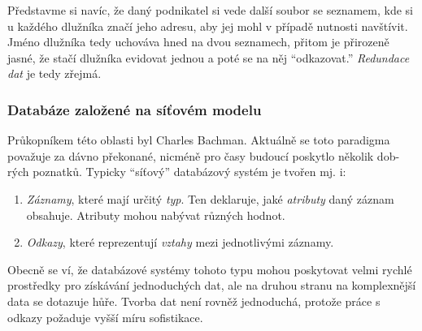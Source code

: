 Představme si navíc, že daný podnikatel si vede další soubor se seznamem, kde si u každého dlužníka značí jeho adresu, aby jej mohl v případě nutnosti navštívit. Jméno dlužníka tedy uchováva hned na dvou seznamech, přitom je přirozeně jasné, že stačí dlužníka evidovat jednou a poté se na něj \enquote{odkazovat.} \textit{Redundace dat} je tedy zřejmá.

\subsubsection{Databáze založené na síťovém modelu}
Průkopníkem této oblasti byl Charles Bachman. Aktuálně se toto paradigma považuje za dávno překonané, nicméně pro časy budoucí poskytlo několik dob-rých poznatků. Typicky \enquote{síťový} databázový systém je tvořen mj. i:
\begin{enumerate}
\item \textit{Záznamy}, které mají určitý \textit{typ}. Ten deklaruje, jaké \textit{atributy} daný záznam obsahuje. Atributy mohou nabývat různých hodnot.
\item \textit{Odkazy}, které reprezentují \textit{vztahy} mezi jednotlivými záznamy.
\end{enumerate}
Obecně se ví, že databázové systémy tohoto typu mohou poskytovat velmi rychlé prostředky pro získávání jednoduchých dat, ale na druhou stranu na komplexnější data se dotazuje hůře. Tvorba dat není rovněž jednoduchá, protože práce s odkazy požaduje vyšší míru sofistikace.

